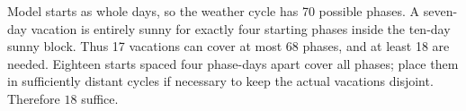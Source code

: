 Model starts as whole days, so the weather cycle has 70 possible phases. A seven-day vacation is entirely sunny for exactly four starting phases inside the ten-day sunny block. Thus 17 vacations can cover at most 68 phases, and at least 18 are needed. Eighteen starts spaced four phase-days apart cover all phases; place them in sufficiently distant cycles if necessary to keep the actual vacations disjoint. Therefore $\boxed{18}$ suffice.
